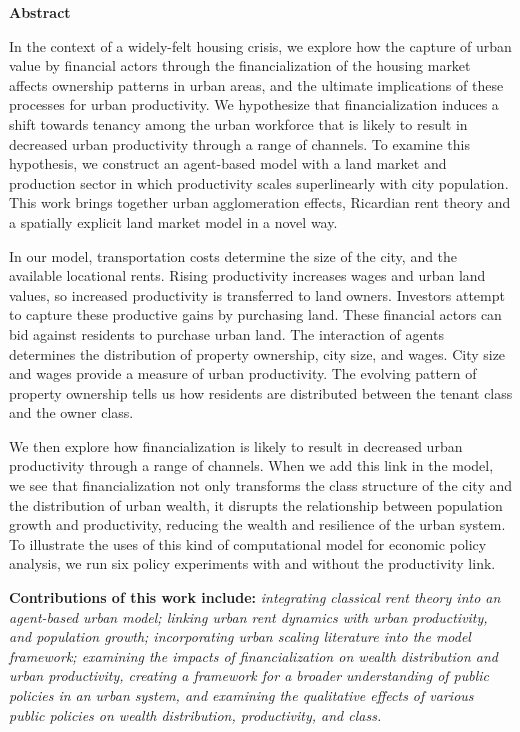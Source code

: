 \begin{center}\textbf{Abstract}\end{center}

In the context of a widely-felt housing crisis, we explore how the capture of urban value by financial actors through the financialization of the housing market affects ownership patterns in urban areas, and the ultimate implications of these processes for urban productivity.  We hypothesize that financialization induces a shift towards tenancy among the urban workforce that is likely to result in decreased urban productivity through a range of channels. To examine this hypothesis, we construct an agent-based model with a land market and production sector in which productivity scales superlinearly with city population. This work brings together urban agglomeration effects, Ricardian rent theory and a spatially explicit land market model in a novel way. 

In our model, transportation costs determine the size of the city, and the available locational rents. Rising productivity increases wages and urban land values, so increased productivity is transferred to land owners. Investors attempt to capture these productive gains by purchasing land. These financial actors can bid against residents to purchase urban land. The interaction of agents determines the distribution of property ownership,  city size, and wages. City size and wages provide a measure of urban productivity. The evolving pattern of property ownership tells us how residents are distributed between the tenant class and the owner class. 

We then explore how financialization is likely to result in decreased urban productivity through a range of channels. When we add this link in the model, we see that financialization not only transforms the class structure of the city and the distribution of urban wealth, it disrupts the relationship between population growth and productivity, reducing the wealth and resilience of the urban system. To illustrate the uses of this kind of computational model for economic policy analysis, we run six policy experiments with and without the productivity link.  

\textbf{Contributions of this work include:} \textit{integrating classical rent theory into an agent-based urban model; linking urban rent dynamics with urban productivity, and population growth; incorporating urban scaling literature into the model framework; examining the impacts of financialization on wealth distribution and urban productivity, creating a framework for a broader understanding of public policies in an urban system, and examining the qualitative effects of various public policies on wealth distribution, productivity, and class.}


